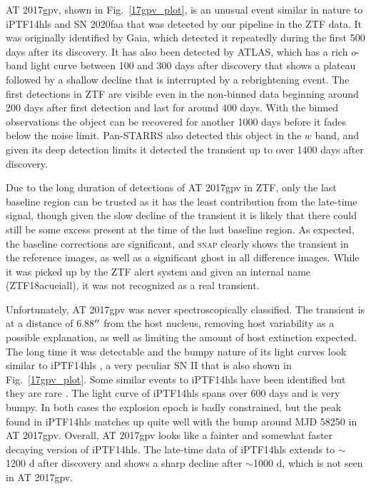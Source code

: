 \documentclass[a4paper,oneside,12pt, class=Latex/Classes/PhDthesisPSnPDF, crop=false]{standalone}
\begin{document}
AT 2017gpv, shown in Fig.~\ref{17gpv_plot}, is an unusual event similar in nature to iPTF14hls \citep{iPTF14hls_Iair, Sollerman_2019_iptf14hls} and SN 2020faa \citep{Yang_2021_20faa} that was detected by our pipeline in the ZTF data. It was originally identified by Gaia, which detected it repeatedly during the first 500 days after its discovery. It has also been detected by ATLAS, which has a rich $o$-band light curve between 100 and 300 days after discovery that shows a plateau followed by a shallow decline that is interrupted by a rebrightening event. The first detections in ZTF are visible even in the non-binned data beginning around 200 days after first detection and last for around 400 days. With the binned observations the object can be recovered for another 1000 days before it fades below the noise limit. Pan-STARRS also detected this object in the $w$ band, and given its deep detection limits it detected the transient up to over 1400 days after discovery.

Due to the long duration of detections of AT 2017gpv in ZTF, only the last baseline region can be trusted as it has the least contribution from the late-time signal, though given the slow decline of the transient it is likely that there could still be some excess present at the time of the last baseline region. As expected, the baseline corrections are significant, and \textsc{snap} clearly shows the transient in the reference images, as well as a significant ghost in all difference images. While it was picked up by the ZTF alert system and given an internal name (ZTF18acueiall), it was not recognized as a real transient.

Unfortunately, AT 2017gpv was never spectroscopically classified. The transient is at a distance of 6.88$^{\prime\prime}$ from the host nucleus, removing host variability as a possible explanation, as well as limiting the amount of host extinction expected. The long time it was detectable and the bumpy nature of its light curves look similar to iPTF14hls \citep{iPTF14hls_Iair,Sollerman_2019_iptf14hls}, a very peculiar SN II that is also shown in Fig.~\ref{17gpv_plot}. Some similar events to iPTF14hls have been identified but they are rare \citep{Yang_2021_20faa, Soraisam_2022}. The light curve of iPTF14hls spans over 600 days and is very bumpy. In both cases the explosion epoch is badly constrained, but the peak found in iPTF14hls matches up quite well with the bump around MJD 58250 in AT 2017gpv. Overall, AT 2017gpv looks like a fainter and somewhat faster decaying version of iPTF14hls. The late-time data of iPTF14hls \citep{Sollerman_2019_iptf14hls} extends to $\sim$1200 d after discovery and shows a sharp decline after $\sim$1000 d, which is not seen in AT 2017gpv.
\end{document}
